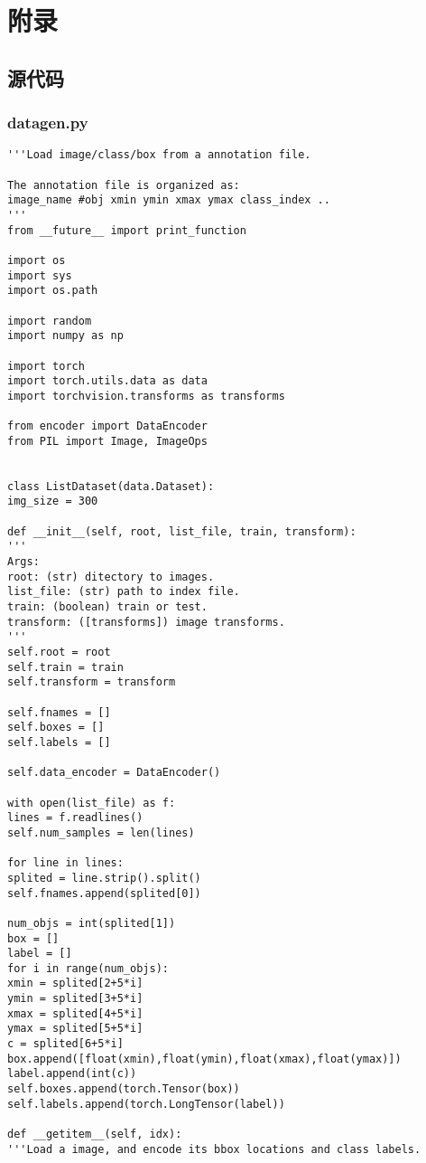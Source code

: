 \section*{附录}
\subsection*{源代码}
\subsubsection*{datagen.py}
\begin{lstlisting}[caption={datagen.py}]
'''Load image/class/box from a annotation file.

The annotation file is organized as:
image_name #obj xmin ymin xmax ymax class_index ..
'''
from __future__ import print_function

import os
import sys
import os.path

import random
import numpy as np

import torch
import torch.utils.data as data
import torchvision.transforms as transforms

from encoder import DataEncoder
from PIL import Image, ImageOps


class ListDataset(data.Dataset):
img_size = 300

def __init__(self, root, list_file, train, transform):
'''
Args:
root: (str) ditectory to images.
list_file: (str) path to index file.
train: (boolean) train or test.
transform: ([transforms]) image transforms.
'''
self.root = root
self.train = train
self.transform = transform

self.fnames = []
self.boxes = []
self.labels = []

self.data_encoder = DataEncoder()

with open(list_file) as f:
lines = f.readlines()
self.num_samples = len(lines)

for line in lines:
splited = line.strip().split()
self.fnames.append(splited[0])

num_objs = int(splited[1])
box = []
label = []
for i in range(num_objs):
xmin = splited[2+5*i]
ymin = splited[3+5*i]
xmax = splited[4+5*i]
ymax = splited[5+5*i]
c = splited[6+5*i]
box.append([float(xmin),float(ymin),float(xmax),float(ymax)])
label.append(int(c))
self.boxes.append(torch.Tensor(box))
self.labels.append(torch.LongTensor(label))

def __getitem__(self, idx):
'''Load a image, and encode its bbox locations and class labels.


\end{lstlisting}
